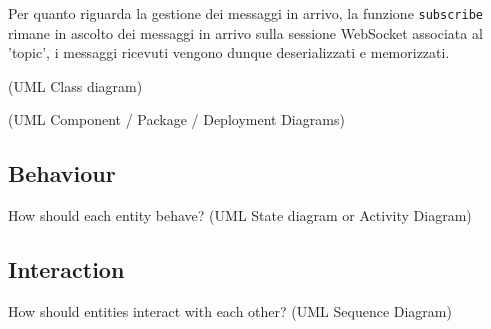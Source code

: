 Per quanto riguarda la gestione dei messaggi in arrivo, la funzione \texttt{subscribe} rimane in ascolto dei messaggi in arrivo sulla sessione WebSocket
associata al 'topic', i messaggi ricevuti vengono dunque deserializzati e memorizzati.


%
(UML Class diagram)

%
(UML Component / Package / Deployment Diagrams)

\subsection{Behaviour}

How should each entity behave?
%
(UML State diagram or Activity Diagram)

\subsection{Interaction}

How should entities interact with each other?
%
(UML Sequence Diagram)
